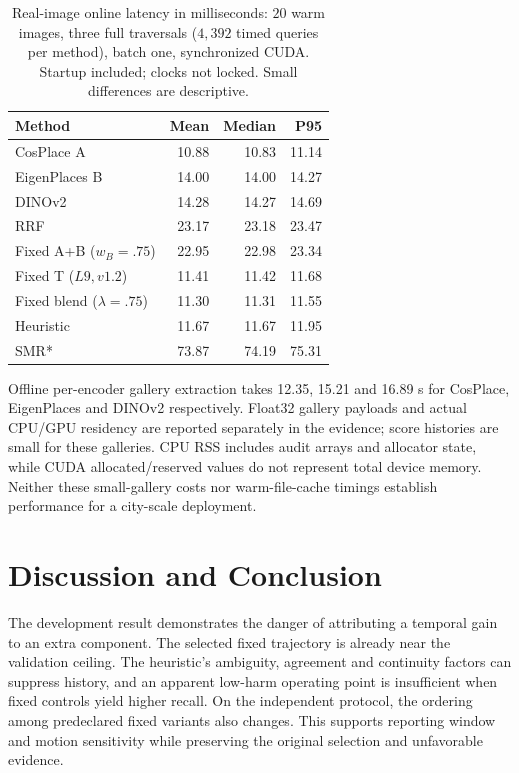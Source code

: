 \documentclass[conference]{IEEEtran}
\begin{document}
\begin{table}[t]\centering\small
\caption{Real-image online latency in milliseconds: $20$ warm images, three full traversals ($4,392$ timed queries per method), batch one, synchronized CUDA. Startup included; clocks not locked. Small differences are descriptive.}\label{tab:latency}
\begin{tabular}{lrrr}\toprule Method & Mean & Median & P95\\\midrule
CosPlace A & 10.88 & 10.83 & 11.14\\
EigenPlaces B & 14.00 & 14.00 & 14.27\\
DINOv2 & 14.28 & 14.27 & 14.69\\
RRF & 23.17 & 23.18 & 23.47\\
Fixed A+B ($w_B=.75$) & 22.95 & 22.98 & 23.34\\
Fixed T ($L9,v1.2$) & 11.41 & 11.42 & 11.68\\
Fixed blend ($\lambda=.75$) & 11.30 & 11.31 & 11.55\\
Heuristic & 11.67 & 11.67 & 11.95\\
SMR* & 73.87 & 74.19 & 75.31\\
\bottomrule\end{tabular}\end{table}

Offline per-encoder gallery extraction takes 12.35, 15.21 and 16.89 s for CosPlace, EigenPlaces and DINOv2 respectively. Float32 gallery payloads and actual CPU/GPU residency are reported separately in the evidence; score histories are small for these galleries. CPU RSS includes audit arrays and allocator state, while CUDA allocated/reserved values do not represent total device memory. Neither these small-gallery costs nor warm-file-cache timings establish performance for a city-scale deployment.

\section{Discussion and Conclusion}
The development result demonstrates the danger of attributing a temporal gain to an extra component. The selected fixed trajectory is already near the validation ceiling. The heuristic's ambiguity, agreement and continuity factors can suppress history, and an apparent low-harm operating point is insufficient when fixed controls yield higher recall. On the independent protocol, the ordering among predeclared fixed variants also changes. This supports reporting window and motion sensitivity while preserving the original selection and unfavorable evidence.
\end{document}
